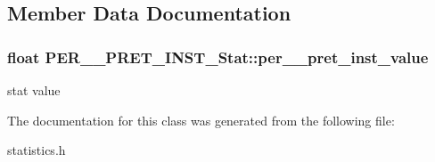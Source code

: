 \subsection{Member Data Documentation}
\hypertarget{classPER__1000__PRET__INST__Stat_a00fced31ff12b4b45b9d9e43aae01a60}{
\subsubsection[{per\_\-1000\_\-pret\_\-inst\_\-value}]{\setlength{\rightskip}{0pt plus 5cm}float {\bf PER\_\_\-PRET\_\-INST\_\-Stat::per\_\_\-pret\_\-inst\_\-value}}}
\label{classPER__1000__PRET__INST__Stat_a00fced31ff12b4b45b9d9e43aae01a60}
stat value 

The documentation for this class was generated from the following file:\begin{DoxyCompactItemize}
\item 
statistics.h\end{DoxyCompactItemize}
